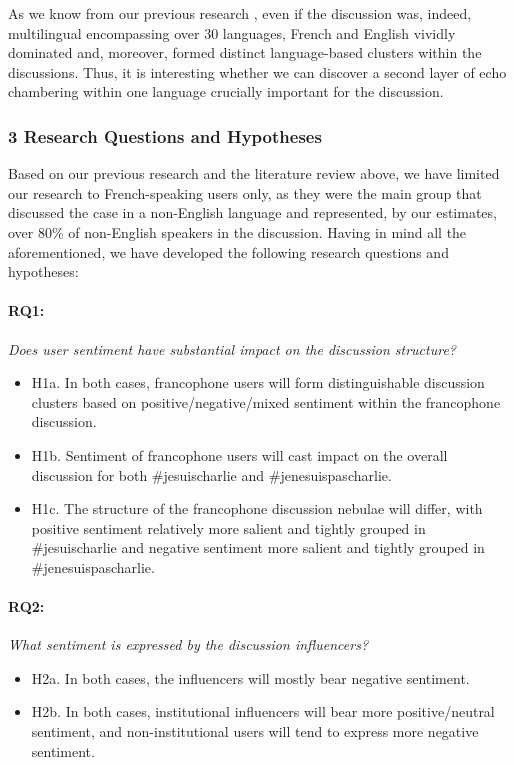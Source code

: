 As we know from our previous research \cite{BodrunovaSmoliarovaBlekanov}, even if the discussion was, indeed, multilingual encompassing over 30 languages, French and English vividly dominated and, moreover, formed distinct language-based clusters within the discussions. Thus, it is interesting whether we can discover a second layer of echo chambering within one language crucially important for the discussion.

\subsubsection{3 Research Questions and Hypotheses}

Based on our previous research and the literature review above, we have limited our research to French-speaking users only, as they were the main group that discussed the case in a non-English language and represented, by our estimates, over 80\% of non-English speakers in the discussion. Having in mind all the aforementioned, we have developed the following research questions and hypotheses:

\paragraph{RQ1:} \textit{Does user sentiment have substantial impact on the discussion structure?}
\begin{itemize}
	\item H1a. In both cases, francophone users will form distinguishable discussion clusters based on positive/negative/mixed sentiment within the francophone discussion. 
	
	\item H1b. Sentiment of francophone users will cast impact on the overall discussion for both \#jesuischarlie and \#jenesuispascharlie.
	
	\item H1c. The structure of the francophone discussion nebulae will differ, with positive sentiment relatively more salient and tightly grouped in \#jesuischarlie and negative sentiment more salient and tightly grouped in \#jenesuispascharlie.
\end{itemize}

\paragraph{RQ2:} \textit{What sentiment is expressed by the discussion influencers?}
\begin{itemize}
	\item H2a. In both cases, the influencers will mostly bear negative sentiment.
	
	\item H2b. In both cases, institutional influencers will bear more positive/neutral sentiment, and non-institutional users will tend to express more negative sentiment.
\end{itemize}

